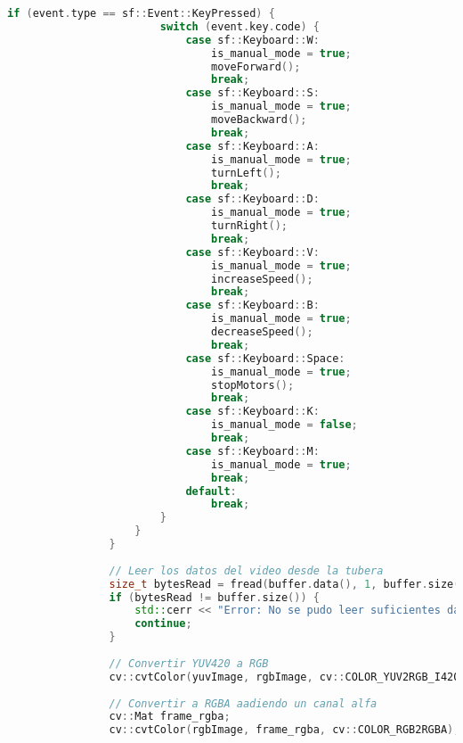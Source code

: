 \begin{lstlisting}[language={C++}, caption={Segundo ajuste de c\'odigo}, label={SegundoAjuste}]
                    if (event.type == sf::Event::KeyPressed) {
                        switch (event.key.code) {
                            case sf::Keyboard::W:
                                is_manual_mode = true;
                                moveForward();
                                break;
                            case sf::Keyboard::S:
                                is_manual_mode = true;
                                moveBackward();
                                break;
                            case sf::Keyboard::A:
                                is_manual_mode = true;
                                turnLeft();
                                break;
                            case sf::Keyboard::D:
                                is_manual_mode = true;
                                turnRight();
                                break;
                            case sf::Keyboard::V:
                                is_manual_mode = true;
                                increaseSpeed();
                                break;
                            case sf::Keyboard::B:
                                is_manual_mode = true;
                                decreaseSpeed();
                                break;
                            case sf::Keyboard::Space:
                                is_manual_mode = true;
                                stopMotors();
                                break;
                            case sf::Keyboard::K:
                                is_manual_mode = false;
                                break;
                            case sf::Keyboard::M:
                                is_manual_mode = true;
                                break;
                            default:
                                break;
                        }
                    }
                }
        
                // Leer los datos del video desde la tubera
                size_t bytesRead = fread(buffer.data(), 1, buffer.size(), pipe);
                if (bytesRead != buffer.size()) {
                    std::cerr << "Error: No se pudo leer suficientes datos de video." << std::endl;
                    continue;
                }
        
                // Convertir YUV420 a RGB
                cv::cvtColor(yuvImage, rgbImage, cv::COLOR_YUV2RGB_I420);
        
                // Convertir a RGBA aadiendo un canal alfa
                cv::Mat frame_rgba;
                cv::cvtColor(rgbImage, frame_rgba, cv::COLOR_RGB2RGBA);
        

\end{lstlisting}
